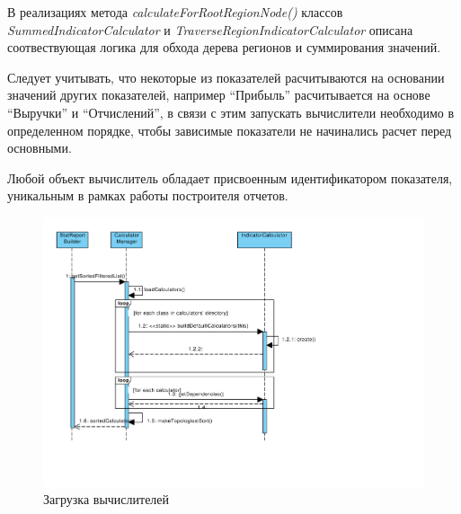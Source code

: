 В реализациях метода \textit{calculateForRootRegionNode()} классов \textit{SummedIndicatorCalculator} и \textit{TraverseRegionIndicatorCalculator} 
описана соотвествующая логика для обхода дерева регионов и суммирования значений.

Следует учитывать, что некоторые из показателей расчитываются на основании значений других показателей,
например ``Прибыль'' расчитывается на основе ``Выручки'' и ``Отчислений'', в связи с этим запускать
вычислители необходимо в определенном порядке, чтобы зависимые показатели не начинались расчет перед
основными.

Любой объект вычислитель обладает присвоенным идентификатором показателя, уникальным в рамках работы построителя отчетов.

\begin{figure}[!ht]
\begin{center}
\vspace{-0.2cm}
\includegraphics[scale=0.50, trim=00mm 30mm 00mm 10mm, clip]{../resources/uml/CalculatorLoading.pdf}
\caption{Загрузка вычислителей}
\label{gr:report_creation}
\end{center} 
\end{figure}

